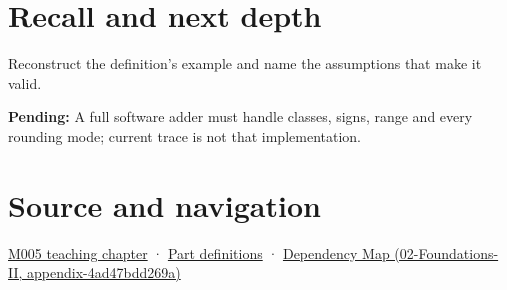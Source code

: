 \section{Recall and next depth}\label{appendix-a1b1b4580dfd-recall-and-next-depth}

Reconstruct the definition's example and name the assumptions that make it valid.

\textbf{Pending:} A full software adder must handle classes, signs, range and every rounding mode; current trace is not that implementation.

\section{Source and navigation}\label{appendix-a1b1b4580dfd-source-and-navigation}

\href{Continuous\%20Notes/Computing\%20Foundations\%20-\%20From\%20Bits\%20to\%20C++\%20and\%20Systems\%20APIs\#When\%20arithmetic\%20meets\%20uncertainty}{M005 teaching chapter} · \hyperref[appendix-fd090d982a15-m005---parts-77-88]{Part definitions} · \href{../02-Foundations-II/main.pdf\#nameddest=appendix-4ad47bdd269a}{Dependency Map (02-Foundations-II, appendix-4ad47bdd269a)}
